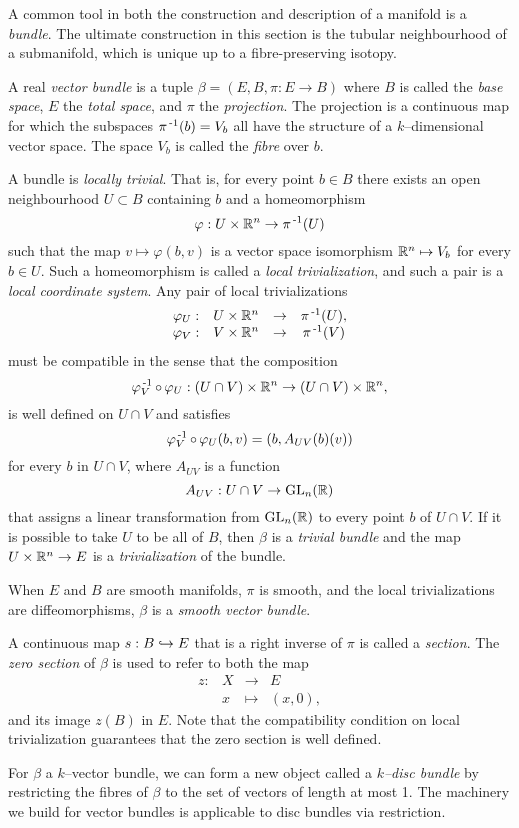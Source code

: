 A common tool in both the construction and description of a manifold is a \emph{bundle}.
The ultimate construction in this section is the tubular neighbourhood of a submanifold, which is unique up to a fibre-preserving isotopy.

\begin{defn}[Bundle]
	A real \emph{vector bundle} is a tuple $\beta = (E,B,\pi:E\to B)$ where $B$ is called the \emph{base space}, $E$ the \emph{total space}, and $\pi$ the \emph{projection}.
	The projection is a continuous map for which the subspaces $\pi^{\,\text{-}1}(b)=V_b$ all have the structure of a $k$--dimensional vector space.
	The space $V_b$ is called the \emph{fibre} over $b$.
	
	A bundle is \emph{locally trivial}.
	That is, for every point $b\in B$ there exists an open neighbourhood $U\subset B$ containing $b$ and a homeomorphism
	\[
		\varphi: U\times \mathbb{R}^n\to \pi^{\,\text{-}1}(U)
	\]
	such that the map $v\mapsto\varphi(b,v)$ is a vector space isomorphism $\mathbb{R}^n\mapsto V_b$ for every $b\in U$.
	Such a homeomorphism is called a \emph{local trivialization}, and such a pair is a \emph{local coordinate system}.
	Any pair of local trivializations
	\[
		\begin{array}{cccc}
			\varphi_U: & U\times\mathbb{R}^n & \to & \pi^{\,\text{-}1}(U), \\
			\varphi_V: & V\times\mathbb{R}^n & \to & \pi^{\,\text{-}1}(V)
		\end{array}
	\]
	must be compatible in the sense that the composition 
	\[
		\varphi_V\inv\comp\varphi_U : (U\cap V)\times\RRN\to (U\cap V)\times\RRN,
	\]
	is well defined on $U\cap V$ and satisfies
	\[
		\varphi_V\inv\comp\varphi_U(b,v) = (b, A_{UV}(b)(v))
	\]
	for every $b$ in $U\cap V$, where $A_{UV}$ is a function
	\[
		A_{UV}: U\cap V\to \textrm{GL}_{n}(\mathbb{R})
	\]
	that assigns a linear transformation from $\textrm{GL}_{n}(\mathbb{R})$ to every point $b$ of $U\cap V$.
	If it is possible to take $U$ to be all of $B$, then $\beta$ is a \emph{trivial bundle} and the map $U\times\mathbb{R}^n\to E$ is a \emph{trivialization} of the bundle.
	
	When $E$ and $B$ are smooth manifolds, $\pi$ is smooth, and the local trivializations are diffeomorphisms, $\beta$ is a \emph{smooth vector bundle}.
	
	A continuous map $s:B\hookrightarrow E$ that is a right inverse of $\pi$ is called a \emph{section}.
	The \emph{zero section} of $\beta$ is used to refer to both the map
	\[
		\begin{array}{cccc}
			z: & X & \to 	 & E \\
			   & x & \mapsto & (x,0),
		\end{array}
	\]
	and its image $z(B)$ in $E$.
	Note that the compatibility condition on local trivialization guarantees that the zero section is well defined.
	
	For $\beta$ a $k$--vector bundle, we can form a new object called a \emph{$k$--disc bundle} by restricting the fibres of $\beta$ to the set of vectors of length at most 1.
	The machinery we build for vector bundles is applicable to disc bundles via restriction.
\end{defn}

